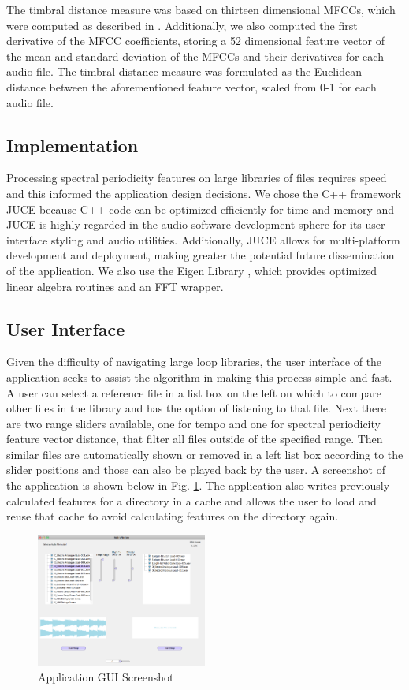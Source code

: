 \documentclass{article}
\begin{document}
The timbral distance measure was based on thirteen dimensional MFCCs, which were computed as described in \cite{jensen2009quantitative}. Additionally, we also computed the first derivative of the MFCC coefficients, storing a 52 dimensional feature vector of the mean and standard deviation of the MFCCs and their derivatives for each audio file. The timbral distance measure was formulated as the Euclidean distance between the aforementioned feature vector, scaled from 0-1 for each audio file.

\subsection{Implementation}

Processing spectral periodicity features on large libraries of files requires speed and this informed the application design decisions. We chose the C++ framework JUCE \cite{juce} because C++ code can be optimized efficiently for time and memory and JUCE is highly regarded in the audio software development sphere for its user interface styling and audio utilities. Additionally, JUCE allows for multi-platform development and deployment, making greater the potential future dissemination of the application. We also use the Eigen Library \cite{eigenweb}, which provides optimized linear algebra routines and an FFT wrapper.

\subsection{User Interface}
Given the difficulty of navigating large loop libraries, the user interface of the application seeks to assist the algorithm in making this process simple and fast. A user can select a reference file in a list box on the left on which to compare other files in the library and has the option of listening to that file. Next there are two range sliders available, one for tempo and one for spectral periodicity feature vector distance, that filter all files outside of the specified range. Then similar files are automatically shown or removed in a left list box according to the slider positions and those can also be played back by the user. A screenshot of the application is shown below in Fig. \ref{fig:gui}. The application also writes previously calculated features for a directory in a cache and allows the user to load and reuse that cache to avoid calculating features on the directory again.

\begin{figure}[h!]
  \centering
    \includegraphics[width=0.5\textwidth]{fLoop_gui.png}
      \caption{Application GUI Screenshot}\label{fig:gui}
\end{figure}
\end{document}
